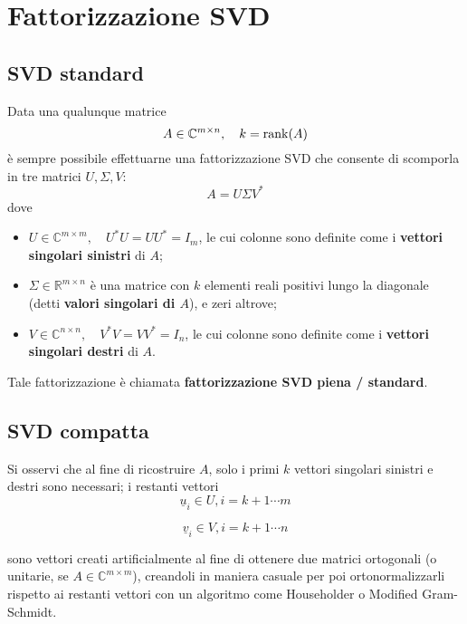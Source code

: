 \chapter{Fattorizzazione SVD}

\section{SVD standard}
Data una qualunque matrice
\begin{equation*}  
A \in \mathbb{C}^{m \times n},\quad k = \operatorname{rank}(A)
\end{equation*}
è sempre possibile effettuarne una fattorizzazione SVD che consente di scomporla 
in tre matrici $U, \Sigma, V$:
\begin{equation}\label{SVD_standard}
A = U \Sigma V^*
\end{equation}
dove
\begin{itemize}
	\item $U \in \mathbb{C}^{m \times m},\quad U^*U = UU^*=I_{m}$, le cui colonne 
sono
	definite come i \textbf{vettori singolari sinistri} di $A$;
	
	\item $\Sigma \in \mathbb{R}^{m\times n}$ è una matrice con $k$ elementi reali
	positivi lungo la diagonale (detti \textbf{valori singolari di $A$}), e zeri 
altrove;
	
	\item $V \in \mathbb{C}^{n \times n}, \quad V^*V = VV^*=I_{n}$, le cui colonne 
sono
	definite come i \textbf{vettori singolari destri} di $A$.
\end{itemize}  

Tale fattorizzazione è chiamata \textbf{fattorizzazione SVD piena / standard}.

\newpage
\section{SVD compatta}
Si osservi che al fine di ricostruire $A$, solo i primi $k$ vettori singolari 
sinistri e destri sono necessari; i restanti vettori
\begin{equation*}
	\underline{u}_{i} \in U, i = k+1 \cdots m
\end{equation*}  

\begin{equation*}
	\underline{v}_{i} \in V, i = k+1 \cdots n
\end{equation*}

sono vettori creati artificialmente al fine di ottenere due matrici ortogonali 
(o unitarie, se $A \in \mathbb{C}^{m \times m}$), creandoli in maniera casuale 
per poi ortonormalizzarli rispetto ai restanti vettori con un algoritmo come 
Householder o Modified Gram-Schmidt.


